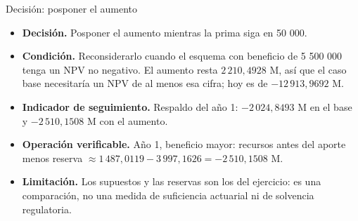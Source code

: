 \documentclass[
  11pt,
  ignorenonframetext,
  aspectratio=169,
]{beamer}
\providecommand{\tightlist}{%
  \setlength{\itemsep}{0pt}\setlength{\parskip}{0pt}}\usepackage{longtable,booktabs,array}
\begin{document}
\begin{frame}{Decisión: posponer el aumento}
\label{decisiuxf3n-posponer-el-aumento}
\small

\begin{itemize}
\tightlist
\item
  \textbf{Decisión.} Posponer el aumento mientras la prima siga en 50
  000.
\item
  \textbf{Condición.} Reconsiderarlo cuando el esquema con beneficio de
  5 500 000 tenga un NPV no negativo. El aumento resta \(2\,210{,}4928\)
  M, así que el caso base necesitaría un NPV de al menos esa cifra; hoy
  es de \(-12\,913{,}9692\) M.
\item
  \textbf{Indicador de seguimiento.} Respaldo del año 1:
  \(-2\,024{,}8493\) M en el base y \(-2\,510{,}1508\) M con el aumento.
\item
  \textbf{Operación verificable.} Año 1, beneficio mayor: recursos antes
  del aporte menos reserva
  \(\approx 1\,487{,}0119 - 3\,997{,}1626 = -2\,510{,}1508\) M.
\item
  \textbf{Limitación.} Los supuestos y las reservas son los del
  ejercicio: es una comparación, no una medida de suficiencia actuarial
  ni de solvencia regulatoria.
\end{itemize}
\end{frame}
\end{document}
